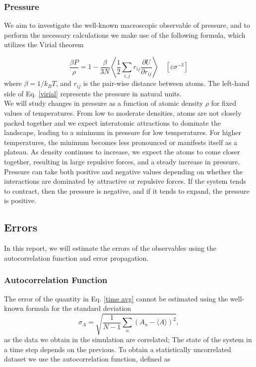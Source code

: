 \documentclass[twocolumn,10pt]{article}
\begin{document}
\subsubsection{Pressure}
We aim to investigate the well-known macroscopic observable of pressure, and to perform the necessary calculations we make use of the following formula, which utilizes the Virial theorem 

\begin{equation}
    \frac{\beta P}{\rho} = 1 - \frac{\beta}{3 N} \left<\frac{1}{2} \sum_{i,j} r_{ij} \frac{\partial U}{\partial r_{ij}} \right> \quad \left[\varepsilon\sigma^{-3}\right]
    \label{virial}
\end{equation}
where $\beta=1/k_BT$, and $r_{ij}$ is the pair-wise distance between atoms. The left-hand side of Eq. \eqref{virial} represents the pressure in natural units.\\

We will study changes in pressure as a function of atomic density $\rho$ for fixed values of temperatures. From low to moderate densities, atoms are not closely packed together and we expect interatomic attractions to dominate the landscape, leading to a minimum in pressure for low temperatures. For higher temperatures, the minimum becomes less pronounced or manifests itself as a plateau. As density continues to increase, we expect the atoms to come closer together, resulting in large repulsive forces, and a steady increase in pressure.\\

Pressure can take both positive and negative values depending on whether the interactions are dominated by attractive or repulsive forces. If the system tends to contract, then the pressure is negative, and if it tends to expand, the pressure is positive.
\subsection{ Errors }

In this report, we will estimate the errors of the observables using the autocorrelation function \cite{computational_book} and error propagation.

\subsubsection{Autocorrelation Function} 
The error of the quantity in Eq. \eqref{time avg} cannot be estimated using the well-known formula for the standard deviation
\begin{equation}
 \sigma_A = \sqrt{\frac{1}{N-1}\sum_n\left(A_n - \langle A \rangle \right)^2},
\end{equation}
as the data we obtain in the simulation are correlated; The state of the system in a time step depends on the previous. To obtain a statistically uncorrelated dataset we use the autocorrelation function, defined as
\end{document}
